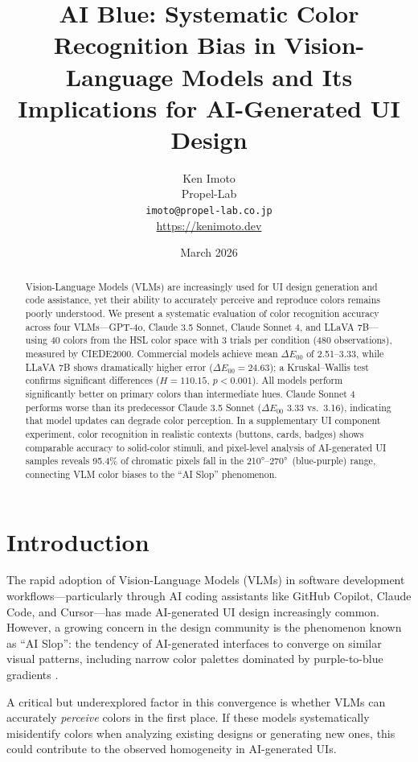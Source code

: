 \documentclass[11pt,a4paper]{article}
\title{AI Blue: Systematic Color Recognition Bias in Vision-Language Models and Its Implications for AI-Generated UI Design}
\author{Ken Imoto\\
Propel-Lab\\
\texttt{imoto@propel-lab.co.jp}\\
\url{https://kenimoto.dev}}
\date{March 2026}
\begin{document}
\maketitle

\begin{abstract}
Vision-Language Models (VLMs) are increasingly used for UI design generation and code assistance, yet their ability to accurately perceive and reproduce colors remains poorly understood.
We present a systematic evaluation of color recognition accuracy across four VLMs---GPT-4o, Claude 3.5 Sonnet, Claude Sonnet 4, and LLaVA 7B---using 40 colors from the HSL color space with 3 trials per condition (480 observations), measured by CIEDE2000.
Commercial models achieve mean $\Delta E_{00}$ of 2.51--3.33, while LLaVA 7B shows dramatically higher error ($\Delta E_{00} = 24.63$); a Kruskal--Wallis test confirms significant differences ($H = 110.15$, $p < 0.001$).
All models perform significantly better on primary colors than intermediate hues.
Claude Sonnet 4 performs worse than its predecessor Claude 3.5 Sonnet ($\Delta E_{00}$ 3.33 vs.\ 3.16), indicating that model updates can degrade color perception.
In a supplementary UI component experiment, color recognition in realistic contexts (buttons, cards, badges) shows comparable accuracy to solid-color stimuli, and pixel-level analysis of AI-generated UI samples reveals 95.4\% of chromatic pixels fall in the 210°--270°\ (blue-purple) range, connecting VLM color biases to the ``AI Slop'' phenomenon.
\end{abstract}

\section{Introduction}

The rapid adoption of Vision-Language Models (VLMs) in software development workflows---particularly through AI coding assistants like GitHub Copilot, Claude Code, and Cursor---has made AI-generated UI design increasingly common. However, a growing concern in the design community is the phenomenon known as ``AI Slop'': the tendency of AI-generated interfaces to converge on similar visual patterns, including narrow color palettes dominated by purple-to-blue gradients \cite{macquarie2025}.

A critical but underexplored factor in this convergence is whether VLMs can accurately \textit{perceive} colors in the first place. If these models systematically misidentify colors when analyzing existing designs or generating new ones, this could contribute to the observed homogeneity in AI-generated UIs.
\end{document}
